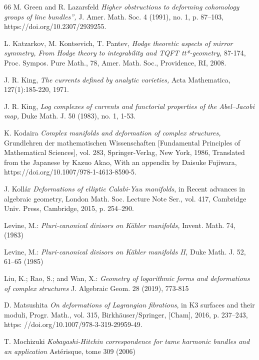 \documentclass[english]{amsart}
\numberwithin{equation}{thm}
\begin{document}
\begin{thebibliography}{66}
		 M. Green and R. Lazarsfeld {\em Higher obstructions to deforming cohomology groups of line bundles”, } J. Amer.
		Math. Soc. 4 (1991), no. 1, p. 87–103, https://doi.org/10.2307/2939255.
		
		
		 L. Katzarkov, M. Kontsevich, T. Pantev, {\em Hodge theoretic aspects of mirror symmetry, From
		Hodge theory to integrability and TQFT tt*-geometry,} 87-174, Proc. Sympos. Pure Math., 78,
		Amer. Math. Soc., Providence, RI, 2008.
		
		 J. R. King, {\em The currents defined by analytic varieties,} Acta Mathematica, 127(1):185-220, 1971.
		
		 J. R. King, {\em Log complexes of currents and functorial properties of the Abel–Jacobi map, } Duke
		Math. J. 50 (1983), no. 1, 1-53.
		
		
			K. Kodaira {\em Complex manifolds and deformation of complex structures,} Grundlehren der
		mathematischen Wissenschaften [Fundamental Principles of Mathematical Sciences], vol.
		283, Springer-Verlag, New York, 1986, Translated from the Japanese by Kazuo Akao, With
		an appendix by Daisuke Fujiwara, https://doi.org/10.1007/978-1-4613-8590-5.
		
			J. Kollár {\em Deformations of elliptic Calabi-Yau manifolds}, in Recent advances in
		algebraic geometry, London Math. Soc. Lecture Note Ser., vol. 417, Cambridge Univ.
		Press, Cambridge, 2015, p. 254–290. 
		
		 Levine, M.: {\em Pluri-canonical divisors on K\"ahler manifolds,} Invent. Math.
		74, (1983)
		
		  Levine, M.: {\em Pluri-canonical divisors on K\"ahler manifolds II,} Duke Math.
		J. 52, 61--65 (1985)
		
		 Liu, K.; Rao, S.; and  Wan, X.: {\em Geometry of logarithmic forms and deformations of complex structures } J. Algebraic Geom. 28 (2019), 773-815
		
			D. Matsushita {\em On deformations of Lagrangian fibrations}, in K3 surfaces and their
		moduli, Progr. Math., vol. 315, Birkhäuser/Springer, [Cham], 2016, p. 237–243, https:
		//doi.org/10.1007/978-3-319-29959-49.
		
		
	 	T. Mochizuki {\em Kobayashi-Hitchin correspondence for tame harmonic bundles and an application}	Astérisque, tome 309 (2006)
		

\end{thebibliography}
\end{document}
